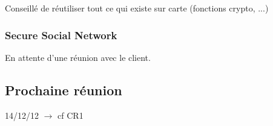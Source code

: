 \documentclass[a4paper,10pt]{article}
\begin{document}
Conseillé de réutiliser tout ce qui existe sur carte (fonctions crypto, ...) 
         
                
\subsubsection*{Secure Social Network}

    En attente d'une réunion avec le client.

\subsection*{Prochaine réunion}
    14/12/12 $\rightarrow$ cf CR1
\end{document}
